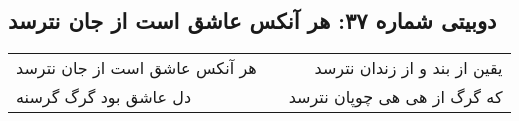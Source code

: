 \begin{center}
\section*{دوبیتی شماره ۳۷: هر آنکس عاشق است از جان نترسد}
\label{sec:037}
\begin{longtable}{l p{0.5cm} r}
هر آنکس عاشق است از جان نترسد
&&
یقین از بند و از زندان نترسد
\\
دل عاشق بود گرگ گرسنه
&&
که گرگ از هی هی چوپان نترسد
\\
\end{longtable}
\end{center}
